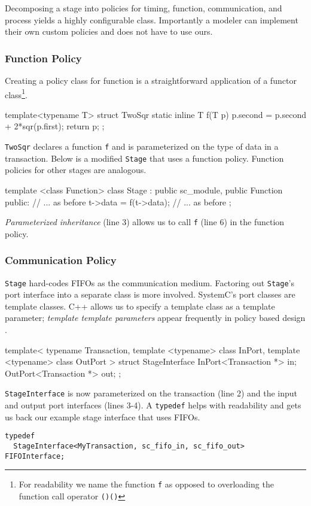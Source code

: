 \documentclass{entcs}
\begin{document}
Decomposing a stage into policies for timing, function, communication, and process yields a
highly configurable class.
Importantly a modeler can implement their own custom policies and does not have to use ours.

\subsubsection{Function Policy}
Creating a policy class for function is a straightforward
application of a functor class\footnote{For readability we name the function {\tt f} as opposed to
overloading the function call operator {\tt ()()}}.
\begin{listing}{1}
template<typename T>
struct TwoSqr {
  static inline T f(T p) {
    p.second = p.second + 2*sqr(p.first);
    return p;
  }
};
\end{listing}
{\tt TwoSqr} declares a function {\tt f} and is parameterized on the type of data in a transaction.
Below is a modified {\tt Stage} that uses a function policy.
Function policies for other stages are analogous.
\begin{listing}{1}
template <class Function>
class Stage : public sc_module,
              public Function {
public:
  // ... as before
    t->data = f(t->data);
  // ... as before
};
\end{listing}
{\em Parameterized inheritance} (line 3) allows us to
call {\tt f} (line 6) in the function policy.

\subsubsection{Communication Policy}
{\tt Stage} hard-codes FIFOs as the communication medium.
Factoring out {\tt Stage}'s port interface into a separate
class is more involved. SystemC's port classes are template classes.
C++ allows us to specify a template class as a template parameter;
 {\em template template parameters} appear frequently in policy based
design \cite{Alexandrescu01}.
\begin{listing}{1}
template<
   typename Transaction,
   template <typename> class InPort,
   template <typename> class OutPort
>
struct StageInterface {
  InPort<Transaction *> in;
  OutPort<Transaction *> out;
};
\end{listing}
{\tt StageInterface} is now parameterized on the transaction (line 2) and the input and output
port interfaces (lines 3-4). A {\tt typedef} helps with readability and gets us back our example stage
interface that uses FIFOs.
\begin{verbatim}
typedef
  StageInterface<MyTransaction, sc_fifo_in, sc_fifo_out> FIFOInterface;
\end{verbatim}
\end{document}
